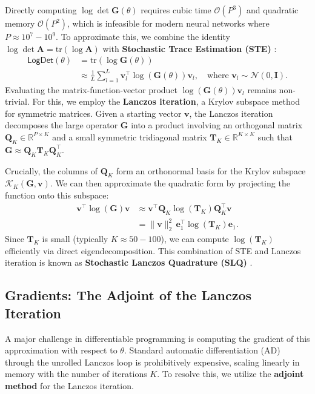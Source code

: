 Directly computing $\log\det \mathbf{G}(\theta)$ requires cubic time $\mathcal{O}(P^3)$ and quadratic memory $\mathcal{O}(P^2)$, which is infeasible for modern neural networks where $P \approx 10^7-10^9$. To approximate this, we combine the identity $\log\det \mathbf{A} = \text{tr}(\log \mathbf{A})$ with \textbf{Stochastic Trace Estimation (STE)} \citep{1989hutchinson}:
\begin{align}
    \textsf{LogDet}(\theta) &= \text{tr}(\log \mathbf{G}(\theta)) \nonumber \\
    &\approx \frac{1}{L} \sum_{l=1}^L \mathbf{v}_l^\top \log(\mathbf{G}(\theta)) \mathbf{v}_l, \quad \text{where } \mathbf{v}_l \sim \mathcal{N}(0, \mathbf{I}).
\end{align}
Evaluating the matrix-function-vector product $\log(\mathbf{G}(\theta))\mathbf{v}_l$ remains non-trivial. For this, we employ the \textbf{Lanczos iteration}, a Krylov subspace method for symmetric matrices. Given a starting vector $\mathbf{v}$, the Lanczos iteration decomposes the large operator $\mathbf{G}$ into a product involving an orthogonal matrix $\mathbf{Q}_K \in \mathbb{R}^{P \times K}$ and a small symmetric tridiagonal matrix $\mathbf{T}_K \in \mathbb{R}^{K \times K}$ such that $\mathbf{G} \approx \mathbf{Q}_K \mathbf{T}_K \mathbf{Q}_K^\top$.



Crucially, the columns of $\mathbf{Q}_K$ form an orthonormal basis for the Krylov subspace $\mathcal{K}_K(\mathbf{G}, \mathbf{v})$. We can then approximate the quadratic form by projecting the function onto this subspace:
\begin{align}
    \mathbf{v}^\top \log(\mathbf{G}) \mathbf{v} 
    &\approx \mathbf{v}^\top \mathbf{Q}_K \log(\mathbf{T}_K) \mathbf{Q}_K^\top \mathbf{v} \nonumber \\
    &= \|\mathbf{v}\|_2^2 \, \mathbf{e}_1^\top \log(\mathbf{T}_K) \mathbf{e}_1.
\end{align}
Since $\mathbf{T}_K$ is small (typically $K \approx 50-100$), we can compute $\log(\mathbf{T}_K)$ efficiently via direct eigendecomposition. This combination of STE and Lanczos iteration is known as \textbf{Stochastic Lanczos Quadrature (SLQ)} \citep{ubaru2017fast}.

\subsection{Gradients: The Adjoint of the Lanczos Iteration}

A major challenge in differentiable programming is computing the gradient of this approximation with respect to $\theta$. Standard automatic differentiation (AD) through the unrolled Lanczos loop is prohibitively expensive, scaling linearly in memory with the number of iterations $K$. To resolve this, we utilize the \textbf{adjoint method} for the Lanczos iteration.

